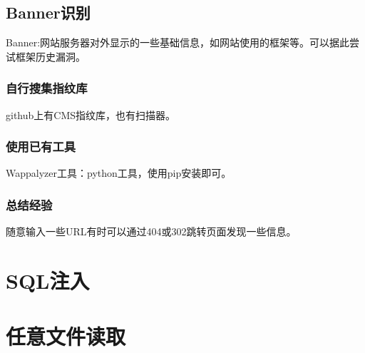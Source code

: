 \subsection{Banner识别}
Banner:网站服务器对外显示的一些基础信息，如网站使用的框架等。可以据此尝试框架历史漏洞。

\subsubsection*{自行搜集指纹库}
github上有CMS指纹库，也有扫描器。

\subsubsection*{使用已有工具}
Wappalyzer工具：python工具，使用pip安装即可。

\subsubsection*{总结经验}
随意输入一些URL有时可以通过404或302跳转页面发现一些信息。


\section{SQL注入}
\section{任意文件读取}